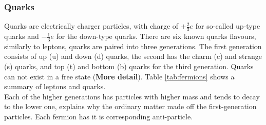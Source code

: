 \subsubsection{Quarks}
Quarks are electrically charger particles, with charge of $+\frac{2}{3}e$ for so-called up-type quarks and $-\frac{1}{3}e$ for the down-type quarks. There are six known quarks flavours, similarly to leptons, quarks are paired into three generations. The first generation consists of up (u) and down (d) quarks, the second has the charm (c) and strange (s) quarks, and top (t) and bottom (b) quarks for the third generation. Quarks can not exist in a free state (\textbf{More detail}). Table \ref{tab:fermions} shows a summary of leptons and quarks. \\
Each of the higher generations has particles with higher mass and tends to decay to the lower one, explains why the ordinary matter made off the first-generation particles. Each fermion has it is corresponding anti-particle.
